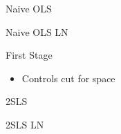 \documentclass{beamer}
\begin{document}
\begin{frame}{Naive OLS}
	\begin{center}
		\scalebox{0.75}{}
	\end{center}
\end{frame}


\begin{frame}{Naive OLS LN}
	\begin{center}
		\scalebox{0.8}{}
	\end{center}
\end{frame}

\begin{frame}{First Stage}
	\begin{center}
		\scalebox{0.90}{}
	\end{center}
	
	\begin{itemize}
		\item  		Controls cut for space
	\end{itemize}
\end{frame}

\begin{frame}{2SLS}
	\begin{center}
		\scalebox{0.75}{}
	\end{center}
\end{frame}

\begin{frame}{2SLS LN}
	\begin{center}
		\scalebox{0.7}{}
	\end{center}
\end{frame}

\end{document}
